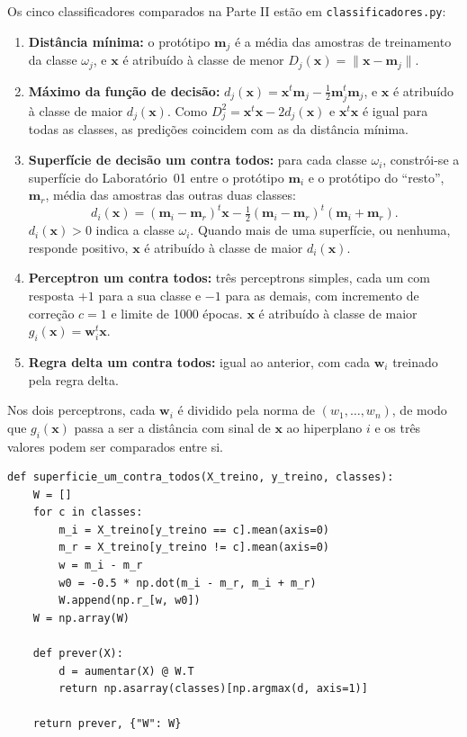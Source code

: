 \documentclass[12pt,a4paper]{article}
\begin{document}
Os cinco classificadores comparados na Parte II estão em \texttt{classificadores.py}:
\begin{enumerate}
  \item \textbf{Distância mínima:} o protótipo $\mathbf{m}_j$ é a média das amostras de treinamento da classe $\omega_j$, e $\mathbf{x}$ é atribuído à classe de menor $D_j(\mathbf{x}) = \|\mathbf{x} - \mathbf{m}_j\|$.
  \item \textbf{Máximo da função de decisão:} $d_j(\mathbf{x}) = \mathbf{x}^t\mathbf{m}_j - \frac{1}{2}\mathbf{m}_j^t\mathbf{m}_j$, e $\mathbf{x}$ é atribuído à classe de maior $d_j(\mathbf{x})$. Como $D_j^2 = \mathbf{x}^t\mathbf{x} - 2d_j(\mathbf{x})$ e $\mathbf{x}^t\mathbf{x}$ é igual para todas as classes, as predições coincidem com as da distância mínima.
  \item \textbf{Superfície de decisão um contra todos:} para cada classe $\omega_i$, constrói-se a superfície do Laboratório~01 entre o protótipo $\mathbf{m}_i$ e o protótipo do ``resto'', $\mathbf{m}_r$, média das amostras das outras duas classes:
  \begin{equation}
    d_i(\mathbf{x}) = (\mathbf{m}_i - \mathbf{m}_r)^t\mathbf{x} - \tfrac{1}{2}(\mathbf{m}_i - \mathbf{m}_r)^t(\mathbf{m}_i + \mathbf{m}_r).
    \label{eq:sup_ova}
  \end{equation}
  $d_i(\mathbf{x}) > 0$ indica a classe $\omega_i$. Quando mais de uma superfície, ou nenhuma, responde positivo, $\mathbf{x}$ é atribuído à classe de maior $d_i(\mathbf{x})$.
  \item \textbf{Perceptron um contra todos:} três perceptrons simples, cada um com resposta $+1$ para a sua classe e $-1$ para as demais, com incremento de correção $c = 1$ e limite de 1000 épocas. $\mathbf{x}$ é atribuído à classe de maior $g_i(\mathbf{x}) = \mathbf{w}_i^t\mathbf{x}$.
  \item \textbf{Regra delta um contra todos:} igual ao anterior, com cada $\mathbf{w}_i$ treinado pela regra delta.
\end{enumerate}
Nos dois perceptrons, cada $\mathbf{w}_i$ é dividido pela norma de $(w_1, \dots, w_n)$, de modo que $g_i(\mathbf{x})$ passa a ser a distância com sinal de $\mathbf{x}$ ao hiperplano $i$ e os três valores podem ser comparados entre si.

\begin{lstlisting}[title=\texttt{classificadores.py} --- superfície de decisão um contra todos]
def superficie_um_contra_todos(X_treino, y_treino, classes):
    W = []
    for c in classes:
        m_i = X_treino[y_treino == c].mean(axis=0)
        m_r = X_treino[y_treino != c].mean(axis=0)
        w = m_i - m_r
        w0 = -0.5 * np.dot(m_i - m_r, m_i + m_r)
        W.append(np.r_[w, w0])
    W = np.array(W)

    def prever(X):
        d = aumentar(X) @ W.T
        return np.asarray(classes)[np.argmax(d, axis=1)]

    return prever, {"W": W}
\end{lstlisting}
\end{document}
